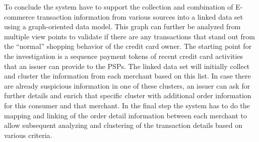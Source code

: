 To conclude the system have to support the collection and combination of \gls{E-commerce} transaction information from various sources into a linked data set using a graph-oriented data model. This graph can further be analyzed from multiple view points to validate if there are any transactions that stand out from the ``normal'' shopping behavior of the credit card owner. The starting point for the investigation is a sequence payment tokens of recent credit card activities that an issuer can provide to the \gls{PSP}s. The linked data set will initially collect and cluster the information from each merchant based on this list. In case there are already suspicious information in one of these clusters, an issuer can ask for further details and enrich that specific cluster with additional order information for this consumer and that merchant. In the final step the system has to do the mapping and linking of the order detail information between each merchant to allow subsequent analyzing and clustering of the transaction details based on various criteria.

